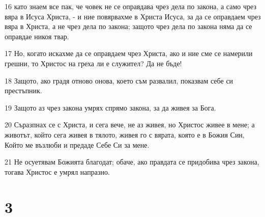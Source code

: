 \par 16 като знаем все пак, че човек не се оправдава чрез дела по закона, а само чрез вяра в Исуса Христа, - и ние повярвахме в Христа Исуса, за да се оправдаем чрез вяра в Христа, а не чрез дела по закона; защото чрез дела по закона няма да се оправдае никоя твар.
\par 17 Но, когато искахме да се оправдаем чрез Христа, ако и ние сме се намерили грешни, то Христос на греха ли е служител? Да не бъде!
\par 18 Защото, ако градя отново онова, което съм развалил, показвам себе си престъпник.
\par 19 Защото аз чрез закона умрях спрямо закона, за да живея за Бога.
\par 20 Съразпнах се с Христа, и сега вече, не аз живея, но Христос живее в мене; а животът, който сега живея в тялото, живея го с вярата, която е в Божия Син, Който ме възлюби и предаде Себе Си за мене.
\par 21 Не осуетявам Божията благодат; обаче, ако правдата се придобива чрез закона, тогава Христос е умрял напразно.

\chapter{3}


